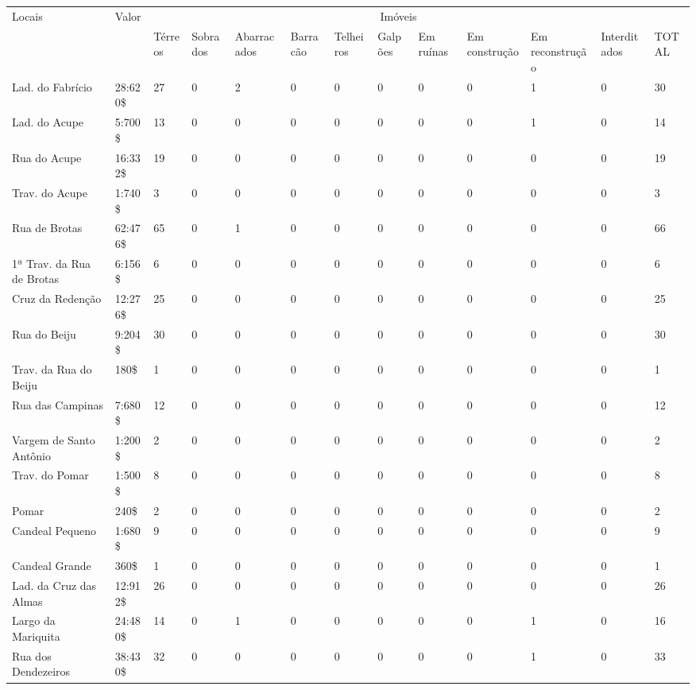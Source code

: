 \begin{sidewaystable}[!htp]
{
\begin{minipage}{\textwidth}
\begin{tiny}
\begin{tabular}{m{3cm} m{1cm} l l l l l l l l l l l}
\toprule
\multirow{2}{*}{Locais}	& \multirow{2}{*}{Valor}	& \multicolumn{10}{c}{Imóveis}\\
\cline{3-13}
	&	&Térreos	&Sobrados	&Abarracados	&Barracão	&Telheiros	&Galpões	&Em ruínas	&Em construção	&Em reconstrução	&Interditados	&TOTAL\\
\midrule
\midrule
Lad. do Fabrício						&28:620\$	&27	&0	&2	&0	&0	&0	&0	&0	&1	&0	&30\\
Lad. do Acupe						&5:700\$	&13	&0	&0	&0	&0	&0	&0	&0	&1	&0	&14\\
Rua do Acupe							&16:332\$	&19	&0	&0	&0	&0	&0	&0	&0	&0	&0	&19\\
Trav. do Acupe						&1:740\$	&3	&0	&0	&0	&0	&0	&0	&0	&0	&0	&3\\
Rua de Brotas							&62:476\$	&65	&0	&1	&0	&0	&0	&0	&0	&0	&0	&66\\
1ª Trav. da Rua de Brotas					&6:156\$	&6	&0	&0	&0	&0	&0	&0	&0	&0	&0	&6\\
Cruz da Redenção						&12:276\$	&25	&0	&0	&0	&0	&0	&0	&0	&0	&0	&25\\
Rua do Beiju							&9:204\$	&30	&0	&0	&0	&0	&0	&0	&0	&0	&0	&30\\
Trav. da Rua do Beiju					&180\$		&1	&0	&0	&0	&0	&0	&0	&0	&0	&0	&1\\
Rua das Campinas						&7:680\$	&12	&0	&0	&0	&0	&0	&0	&0	&0	&0	&12\\
Vargem de Santo Antônio						&1:200\$	&2	&0	&0	&0	&0	&0	&0	&0	&0	&0	&2\\
Trav. do Pomar						&1:500\$	&8	&0	&0	&0	&0	&0	&0	&0	&0	&0	&8\\
Pomar								&240\$		&2	&0	&0	&0	&0	&0	&0	&0	&0	&0	&2\\
Candeal Pequeno							&1:680\$	&9	&0	&0	&0	&0	&0	&0	&0	&0	&0	&9\\
Candeal Grande							&360\$		&1	&0	&0	&0	&0	&0	&0	&0	&0	&0	&1\\
Lad. da Cruz das Almas					&12:912\$	&26	&0	&0	&0	&0	&0	&0	&0	&0	&0	&26\\
Largo da Mariquita						&24:480\$	&14	&0	&1	&0	&0	&0	&0	&0	&1	&0	&16\\
Rua dos Dendezeiros						&38:430\$	&32	&0	&0	&0	&0	&0	&0	&0	&1	&0	&33\\

\end{tabular}
\end{tiny}
\end{minipage}}
\end{sidewaystable}
